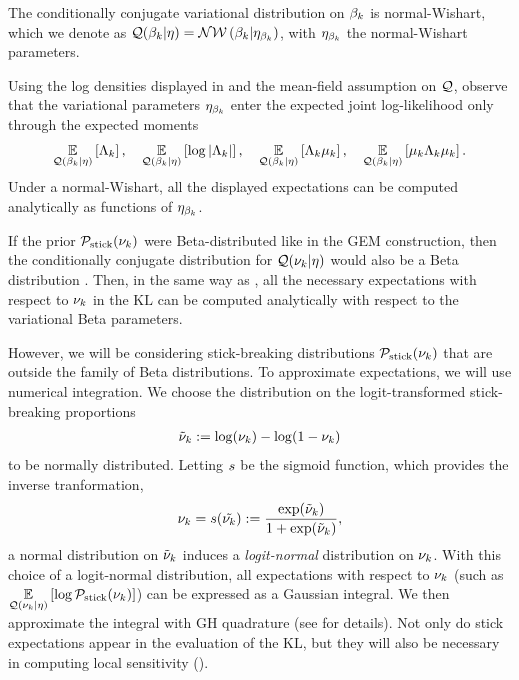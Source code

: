 \begin{ex}
%
The conditionally conjugate variational distribution on $\beta_k$ is
normal-Wishart, which we denote as
$\mathcal{Q}(\beta_k \vert \eta) = \mathcal{N}\mathcal{W}\left(\beta_k \vert \eta_{\beta_k}\right)$,
with $\eta_{\beta_k}$ the normal-Wishart parameters.

Using the log densities displayed in 
and the mean-field assumption on $\mathcal{Q}$,
observe that the variational parameters $\eta_{\beta_k}$
enter the expected joint log-likelihood only through the
expected moments
%
\begin{align*}
\underset{\mathcal{Q}(\beta_k \vert \eta)}{\mathbb{E}}\left[\Lambda_k\right],  \quad
\underset{\mathcal{Q}(\beta_k \vert \eta)}{\mathbb{E}}\left[\log|\Lambda_k|\right],  \quad
\underset{\mathcal{Q}(\beta_k \vert \eta)}{\mathbb{E}}\left[\Lambda_k\mu_k\right], \quad
\underset{\mathcal{Q}(\beta_k \vert \eta)}{\mathbb{E}}\left[\mu_k\Lambda_k\mu_k\right].
\end{align*}
Under a normal-Wishart, all the displayed expectations
can be computed analytically as functions of $\eta_{\beta_k}$.
%
\end{ex}

If the prior $\mathcal{P}_{\mathrm{stick}}(\nu_{k})$ were Beta-distributed like in the GEM construction,
then the conditionally conjugate distribution for $\mathcal{Q}(\nu_{k} \vert \eta)$ would
also be a Beta distribution \citep{blei:2006:vi_for_dp}. Then, in the same way
as , all the necessary expectations with respect to $\nu_{k}$
in the $\mathrm{KL}$ can be computed analytically with respect to the
variational Beta parameters.

However, we will be considering stick-breaking distributions $\mathcal{P}_{\mathrm{stick}}(\nu_{k})$
that are outside the family of Beta distributions. To approximate expectations,
we will use numerical integration. We choose the distribution on the
logit-transformed stick-breaking proportions
%
\begin{align*}
  \tilde{\nu}_k := \log(\nu_k) - \log(1 - \nu_k)
\end{align*}
%
to be normally distributed. Letting $s$ be the sigmoid function,
which provides the inverse tranformation,
%
\begin{align*}
    \nu_{k} = s(\tilde{\nu_{k}}) := \frac{\exp(\tilde{\nu}_k)}{1 + \exp(\tilde{\nu}_k)},
\end{align*}
%
a normal distribution on $\tilde{\nu}_k$ induces a \textit{logit-normal} distribution
on $\nu_{k}$. With this choice of a logit-normal distribution, all expectations
with respect to $\nu_k$ (such as $\underset{\mathcal{Q}(\nu_k\vert\eta)}{\mathbb{E}}\left[\log
\mathcal{P}_{\mathrm{stick}}(\nu_k)\right]$) can be expressed as a Gaussian integral. We then approximate
the integral with GH quadrature (see  for details). Not
only do stick expectations appear in the evaluation of the $\mathrm{KL}$, but
they will also be necessary in computing local sensitivity
().

